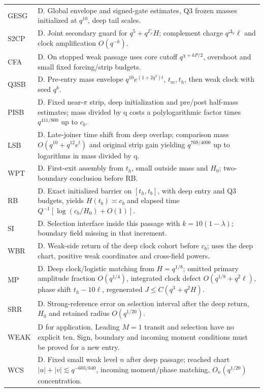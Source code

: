 \documentclass[11pt]{article}
\begin{document}
\begin{longtable}{@{}p{}p{}@{}}
GESG & D. Global envelope and signed-gate estimates, Q3 frozen masses initialized at \(q^{10}\), deep tail scales.\\
S2CP & D. Joint secondary guard for \(q^5+q^{\Gamma_\nu}H\); complement charge \(q^{\Delta_\nu}\ell\) and clock amplification \(O(q^{-k})\).\\
CFA & D. On stopped weak passage uses core cutoff \(q^{\chi+kP/2}\), overshoot and small fixed forcing/strip budgets.\\
Q3SB & D. Pre-entry mass envelope \(q^{10}e^{(1+2q^2)t}\), \(t_m,t_h\), then weak clock with seed \(q^k\).\\
PISB & D. Fixed near-\(\pi\) strip, deep initialization and pre/post half-mass estimates; mass divided by q costs a polylogarithmic factor times \(q^{411/800}\) up to \(c_b\).\\
LSB & D. Late-joiner time shift from deep overlap; comparison mass \(O(q^{10}+q^{12}e^t)\) and original strip gain yielding \(q^{769/4000}\) up to logarithms in mass divided by q.\\
WPT & D. First-exit assembly from \(t_h\), small outside mass and \(H_0\); two-boundary conclusion before RB.\\
RB & D. Exact initialized barrier on \([t_h,t_b]\), with deep entry and Q3 budgets, yields \(H(t_b)\asymp c_b\) and elapsed time \(Q^{-1}[\log(c_b/H_0)+O(1)]\).\\
SI & D. Selection interface inside this passage with \(k=10(1-\lambda)\); boundary field missing in that increment.\\
WBR & D. Weak-side return of the deep clock cohort before \(c_b\); uses the deep chart, positive weak coordinates and cross-field powers.\\
MP & D. Deep clock/logistic matching from \(H=q^{1/8}\); omitted primary amplitude fraction \(O(q^{1/4})\), integrated clock defect \(O(q^{1/8}+q^2\ell)\), phase shift \(t_h-10\ell\), regenerated \(J\le C(q^3+q^2H)\).\\
SRR & D. Strong-reference error on selection interval after the deep return, \(H_0\) and retained radius \(O(q^{1/20})\).\\
WEAK & D for application. Leading \(M=1\) transit and selection have no explicit ten. Sign, boundary and incoming moment conditions must be proved for a new entry.\\
WCS & D. Fixed small weak level \(n\) after deep passage; reached chart \(|u|+|v|\lesssim q^{-603/640}\), incoming moment/phase matching, \(O_n(q^{1/20})\) concentration.\\

\end{longtable}
\end{document}
